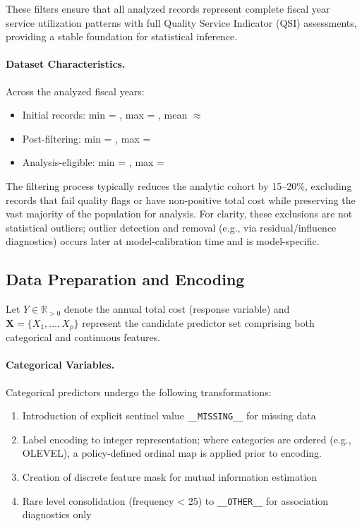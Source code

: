 These filters ensure that all analyzed records represent complete fiscal year service utilization patterns with full Quality Service Indicator (QSI) assessments, providing a stable foundation for statistical inference.

\paragraph{Dataset Characteristics.}
Across the analyzed fiscal years:
\begin{itemize}
    \item Initial records: min = \FSMinRecordsTotal, max = \FSMaxRecordsTotal, mean $\approx$ \FSMeanRecordsTotal
    \item Post-filtering: min = \FSMinRecordsFiltered, max = \FSMaxRecordsFiltered  
    \item Analysis-eligible: min = \FSMinRecordsFinal, max = \FSMaxRecordsFinal
\end{itemize}

The filtering process typically reduces the analytic cohort by 15--20\%, excluding records that fail quality flags or have non-positive total cost while preserving the vast majority of the population for analysis. For clarity, these exclusions are not statistical outliers; outlier detection and removal (e.g., via residual/influence diagnostics) occurs later at model-calibration time and is model-specific.


\subsection{Data Preparation and Encoding}

Let $Y \in \mathbb{R}_{>0}$ denote the annual total cost (response variable) and $\mathbf{X} = \{X_1, \ldots, X_p\}$ represent the candidate predictor set comprising both categorical and continuous features.

\paragraph{Categorical Variables.}
Categorical predictors undergo the following transformations:
\begin{enumerate}
    \item Introduction of explicit sentinel value \texttt{\_\_MISSING\_\_} for missing data
    \item Label encoding to integer representation; where categories are ordered (e.g., OLEVEL), a policy-defined ordinal map is applied prior to encoding.
    \item Creation of discrete feature mask for mutual information estimation
    \item Rare level consolidation (frequency < 25) to \texttt{\_\_OTHER\_\_} for association diagnostics only
\end{enumerate}

